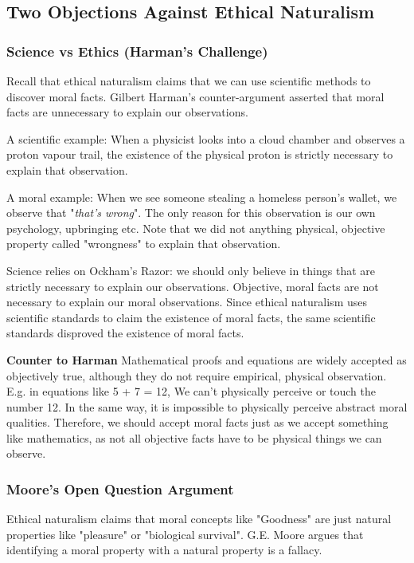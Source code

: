 \documentclass[12pt]{article}
\begin{document}
\subsection{Two Objections Against Ethical Naturalism}
\subsubsection{Science vs Ethics (Harman's Challenge)}
Recall that ethical naturalism claims that we can use scientific methods to discover moral facts.
Gilbert Harman's counter-argument asserted that moral facts are unnecessary to explain our observations.

\noindent A scientific example: When a physicist looks into a cloud chamber and observes a proton vapour trail,
the existence of the physical proton is strictly necessary to explain that observation.

\noindent A moral example: When we see someone stealing a homeless person's wallet,
we observe that "\textit{that's wrong}". The only reason for this observation is our own psychology, upbringing etc.
Note that we did not anything physical, objective property called "wrongness" to explain that observation.

\noindent Science relies on Ockham's Razor: we should only believe in things that are strictly necessary to explain our observations.
Objective, moral facts are not necessary to explain our moral observations.
Since ethical naturalism uses scientific standards to claim the existence of moral facts,
the same scientific standards disproved the existence of moral facts.

\textbf{Counter to Harman} Mathematical proofs and equations are widely accepted
as objectively true, although they do not require empirical, physical observation. 
E.g. in equations like 5 + 7 = 12, We can't physically perceive or touch the number 12.
In the same way, it is impossible to physically perceive abstract moral qualities.
Therefore, we should accept moral facts just as we accept something like mathematics,
as not all objective facts have to be physical things we can observe. 

\subsubsection{Moore’s Open Question Argument}
Ethical naturalism claims that moral concepts like "Goodness" are just natural properties like "pleasure" or "biological survival".
G.E. Moore argues that identifying a moral property with a natural property is a fallacy.
\end{document}
